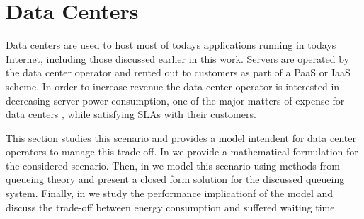 \section{Data Centers}\label{sec:cloud:data_centers}

Data centers are used to host most of todays applications running in todays Internet, including those discussed earlier in this work.
Servers are operated by the data center operator and rented out to customers as part of a \gls{PaaS} or \gls{IaaS} scheme.
In order to increase revenue the data center operator is interested in decreasing server power consumption, one of the major matters of expense for data centers \cite{Greenberg2009b}, while satisfying \glspl{SLA} with their customers.

This section studies this scenario and provides a model intendent for data 	center operators to manage this trade-off.
In  we provide a mathematical formulation for the considered scenario.
Then, in  we model this scenario using methods from queueing theory and present a closed form solution for the discussed queueing system.
Finally, in  we study the performance implicationf of the model and discuss the trade-off between energy consumption and suffered waiting time.




